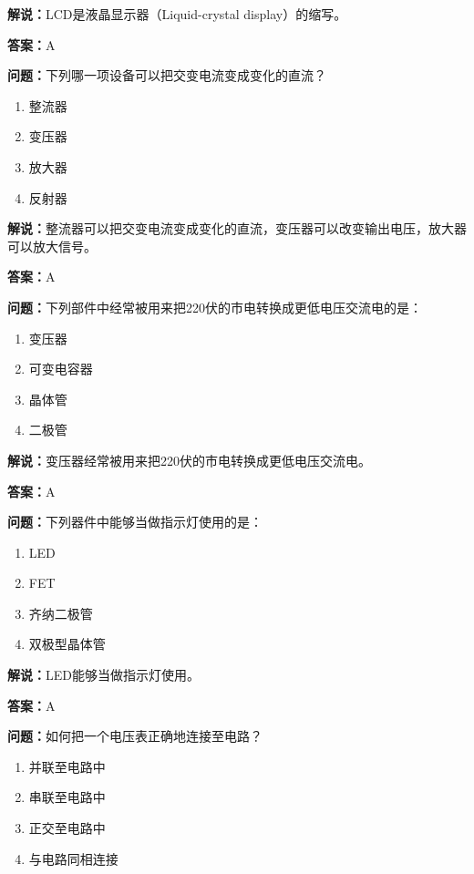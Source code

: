 \textbf{解说：}LCD是液晶显示器（Liquid-crystal display）的缩写。%

\textbf{答案：}A

\textbf{问题：}下列哪一项设备可以把交变电流变成变化的直流？

\begin{enumerate}[label=\Alph*), leftmargin=3em]
	\item 整流器
	\item 变压器
	\item 放大器
	\item 反射器
\end{enumerate}

\textbf{解说：}整流器可以把交变电流变成变化的直流，变压器可以改变输出电压，放大器可以放大信号。%

\textbf{答案：}A

\textbf{问题：}下列部件中经常被用来把220伏的市电转换成更低电压交流电的是：

\begin{enumerate}[label=\Alph*), leftmargin=3em]
	\item 变压器
	\item 可变电容器
	\item 晶体管
	\item 二极管
\end{enumerate}

\textbf{解说：}变压器经常被用来把220伏的市电转换成更低电压交流电。%

\textbf{答案：}A

\textbf{问题：}下列器件中能够当做指示灯使用的是：

\begin{enumerate}[label=\Alph*), leftmargin=3em]
	\item LED
	\item FET
	\item 齐纳二极管
	\item 双极型晶体管
\end{enumerate}

\textbf{解说：}LED能够当做指示灯使用。%

\textbf{答案：}A

\textbf{问题：}如何把一个电压表正确地连接至电路？

\begin{enumerate}[label=\Alph*), leftmargin=3em]
	\item 并联至电路中
	\item 串联至电路中
	\item 正交至电路中
	\item 与电路同相连接
\end{enumerate}

